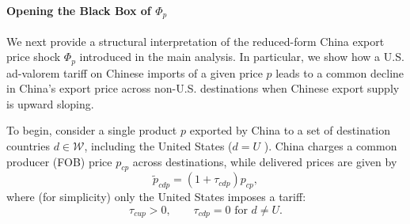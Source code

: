 \documentclass[english,12pt]{article}
\theoremstyle{definition}
\begin{document}
\paragraph{Opening the Black Box of $\Phi _{p}$}

We next provide a structural interpretation of the reduced-form China export
price shock $\Phi _{p}$ introduced in the main analysis. In particular, we
show how a U.S. ad-valorem tariff on Chinese imports of a given price $p$
leads to a common decline in China's export price across non-U.S.
destinations when Chinese export supply is upward sloping.

To begin, consider a single product $p$ exported by China to a set of
destination countries $d\in \mathcal{W}$, including the United States ($d=U$%
). China charges a common producer (FOB) price $p_{cp}$ across destinations,
while delivered prices are given by 
\begin{equation*}
\tilde{p}_{cdp}=(1+\tau _{cdp})p_{cp},
\end{equation*}%
where (for simplicity) only the United States imposes a tariff: 
\begin{equation*}
\tau _{cup}>0,\qquad \tau _{cdp}=0\text{ for }d\neq U.
\end{equation*}
\end{document}
